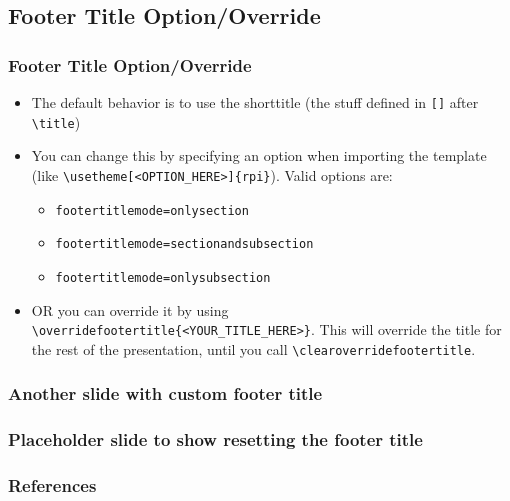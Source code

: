 \documentclass[
	10pt, %
	aspectratio=169, %
]{beamer}
\begin{document}
\subsection{Footer Title Option/Override}
\begin{frame}
	\frametitle{Footer Title Option/Override}
	\begin{itemize}
    \item The default behavior is to use the shorttitle (the stuff defined in \texttt{[]} after \texttt{\textbackslash title})
    \item You can change this by specifying an option when importing the template (like \texttt{\textbackslash usetheme[<OPTION\_HERE>]\{rpi\}}). Valid options are:
      \begin{itemize}
        \item \texttt{footertitlemode=onlysection}
        \item \texttt{footertitlemode=sectionandsubsection}
        \item \texttt{footertitlemode=onlysubsection}
      \end{itemize}
    \item OR you can override it by using \texttt{\textbackslash overridefootertitle\{<YOUR\_TITLE\_HERE>\}}. This will override the title for the rest of the presentation, until you call \texttt{\textbackslash clearoverridefootertitle}.
	\end{itemize}
\end{frame}

\begin{frame}
	\frametitle{Another slide with custom footer title}
\end{frame}

\begin{frame}
	\clearfootertitleoverride
	\frametitle{Placeholder slide to show resetting the footer title}
\end{frame}

\begin{frame}[allowframebreaks]
	\frametitle{References}
	\printbibliography
\end{frame}
\end{document}
